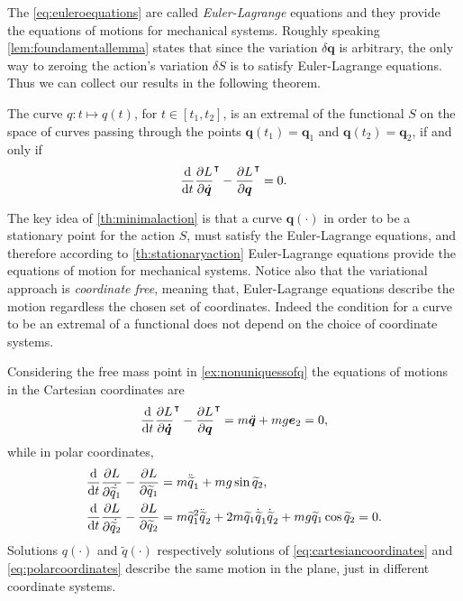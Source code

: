 		The \cref{eq:euleroequations} are called \emph{Euler-Lagrange} equations and they provide the equations of motions for mechanical systems. Roughly speaking \cref{lem:foundamentallemma} states that since the variation $\delta\bm{q}$ is arbitrary, the only way to zeroing the action's variation $\delta S$ is to satisfy Euler-Lagrange equations. Thus we can collect our results in the following theorem.
		\begin{theorem}
			\label{th:minimalaction}
			The curve $q:t\mapsto q(t)$, for $t\in[t_{1},t_{2}]$, is an extremal of the functional $S$ on the space of curves passing through the points $\bm{q}(t_{1}) =\bm{q}_{1}$ and $\bm{q}(t_{2}) = \bm{q}_{2}$, if and only if
			\begin{equation}
				\frac{\mathop{}\!\mathrm{d}}{\mathop{}\!\mathrm{d} t}\frac{\partial L}{\partial\dot{\bm{q}}}^{\intercal}-\frac{\partial L}{\partial \bm{q}}^{\intercal} = 0.
			\end{equation}
		\end{theorem}
		The key idea of \cref{th:minimalaction} is that a curve $\bm{q}(\cdot)$ in order to be a stationary point for the action $S$, must satisfy the Euler-Lagrange equations, and therefore according to \cref{th:stationaryaction} Euler-Lagrange equations provide the equations of motion for mechanical systems. Notice also that the variational approach is \emph{coordinate free}, meaning that, Euler-Lagrange equations describe the motion regardless the chosen set of coordinates. Indeed the condition for a curve to be an extremal of a functional does not depend on the choice of coordinate systems.
		\begin{example}
			Considering the free mass point in \cref{ex:nonuniquessofq} the equations of motions in the Cartesian coordinates are
			\begin{equation}
				\label{eq:cartesiancoordinates}
				\frac{\mathop{}\!\mathrm{d}}{\mathop{}\!\mathrm{d} t}\frac{\partial L}{\partial\bm{\dot{q}}}^{\intercal} - \frac{\partial L}{\partial\bm{q}}^{\intercal} = m\ddot{\bm{q}} + mg\bm{e}_{2} = 0,
			\end{equation}
			while in polar coordinates,
			\begin{subequations}
				\begin{align}
					\frac{\mathop{}\!\mathrm{d}}{\mathop{}\!\mathrm{d} t}\frac{\partial L}{\partial\dot{\widetilde{q}_{1}}} - \frac{\partial L}{\partial\widetilde{q}_{1}} &= m\ddot{\widetilde{q}}_{1} +  mg\sin{\widetilde{q}_{2}}, \\
					\frac{\mathop{}\!\mathrm{d}}{\mathop{}\!\mathrm{d} t}\frac{\partial L}{\partial\dot{\widetilde{q}_{2}}} - \frac{\partial L}{\partial\widetilde{q}_{2}} &= m\widetilde{q}_{1}^{2}\ddot{\widetilde{q}}_{2} +  2m\widetilde{q}_{1}\dot{\widetilde{q}}_{1}\dot{\widetilde{q}}_{2} + mg\widetilde{q}_{1}\cos{\widetilde{q}_{2}} = 0.
				\end{align}
				\label{eq:polarcoordinates}
			\end{subequations}
			Solutions $q(\cdot)$ and $\widetilde{q}(\cdot)$ respectively solutions of \cref{eq:cartesiancoordinates} and \cref{eq:polarcoordinates} describe the same motion in the plane, just in different coordinate systems.
		\end{example} 
